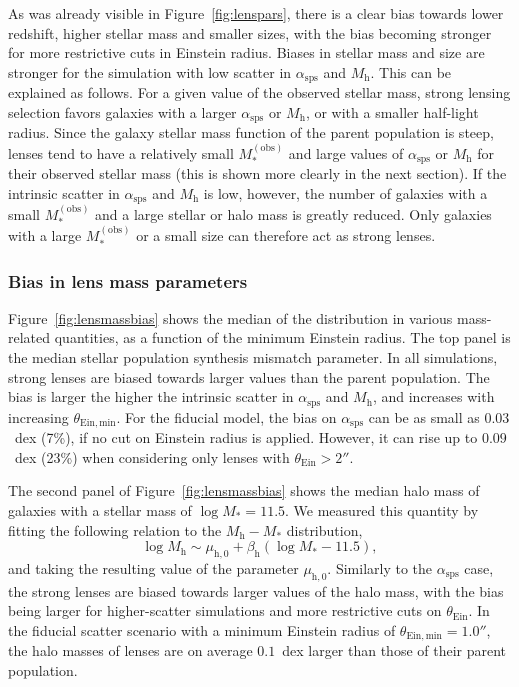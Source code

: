 \documentclass{aa}
\def\mstar{M_*}
\def\asps{\alpha_{\mathrm{sps}}}
\def\mobs{M_*^{(\mathrm{obs})}}
\def\mhalo{M_{\mathrm{h}}}
\def\tein{\theta_{\mathrm{Ein}}}
\def\Fref#1{Figure~\ref{#1}\xspace}
\begin{document}
As was already visible in \Fref{fig:lenspars}, there is a clear bias towards lower redshift, higher stellar mass and smaller sizes, with the bias becoming stronger for more restrictive cuts in Einstein radius.
Biases in stellar mass and size are stronger for the simulation with low scatter in $\asps$ and $\mhalo$.
This can be explained as follows.
For a given value of the observed stellar mass, strong lensing selection favors galaxies with a larger $\asps$ or $\mhalo$, or with a smaller half-light radius.
Since the galaxy stellar mass function of the parent population is steep, lenses tend to have a relatively small $\mobs$ and large values of $\asps$ or $\mhalo$ for their observed stellar mass (this is shown more clearly in the next section).
If the intrinsic scatter in $\asps$ and $\mhalo$ is low, however, the number of galaxies with a small $\mobs$ and a large stellar or halo mass is greatly reduced.
Only galaxies with a large $\mobs$ or a small size can therefore act as strong lenses.

\subsubsection{Bias in lens mass parameters}

\Fref{fig:lensmassbias} shows the median of the distribution in various mass-related quantities, as a function of the minimum Einstein radius.
The top panel is the median stellar population synthesis mismatch parameter.
In all simulations, strong lenses are biased towards larger values than the parent population. The bias is larger the higher the intrinsic scatter in $\asps$ and $\mhalo$, and increases with increasing $\theta_{\mathrm{Ein,min}}$.
For the fiducial model, the bias on $\asps$ can be as small as $0.03$~dex (7\%), if no cut on Einstein radius is applied.
However, it can rise up to $0.09$~dex (23\%) when considering only lenses with $\tein > 2''$.

The second panel of \Fref{fig:lensmassbias} shows the median halo mass of galaxies with a stellar mass of $\log{\mstar}=11.5$.
We measured this quantity by fitting the following relation to the $\mhalo-\mstar$ distribution,
\begin{equation}
\log{\mhalo} \sim \mu_{\mathrm{h},0} + \beta_{\mathrm{h}}(\log{\mstar} - 11.5),
\end{equation}
and taking the resulting value of the parameter $\mu_{\mathrm{h},0}$.
Similarly to the $\asps$ case, the strong lenses are biased towards larger values of the halo mass, with the bias being larger for higher-scatter simulations and more restrictive cuts on $\tein$.
In the fiducial scatter scenario with a minimum Einstein radius of $\theta_{\mathrm{Ein,min}}=1.0''$, the halo masses of lenses are on average $0.1$~dex larger than those of their parent population.
\end{document}
